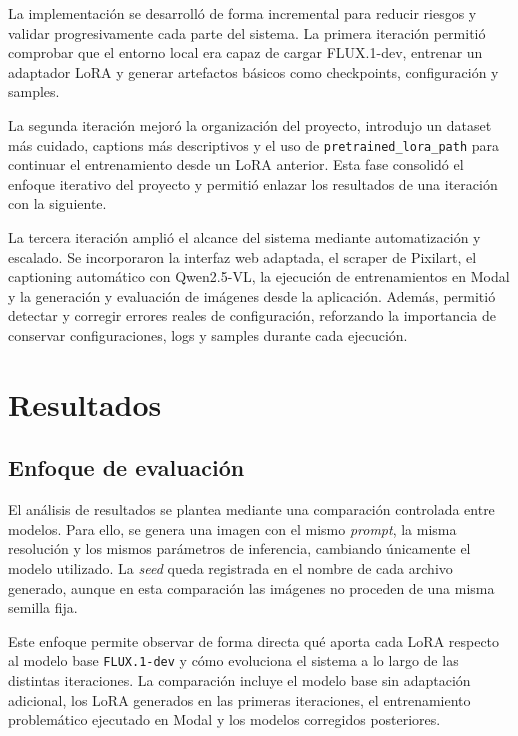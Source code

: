 \documentclass[a4paper,11pt,titlepage]{scrbook}
\begin{document}
La implementación se desarrolló de forma incremental para reducir riesgos y validar progresivamente cada parte del sistema. La primera iteración permitió comprobar que el entorno local era capaz de cargar FLUX.1-dev, entrenar un adaptador LoRA y generar artefactos básicos como checkpoints, configuración y samples.

\medskip

La segunda iteración mejoró la organización del proyecto, introdujo un dataset más cuidado, captions más descriptivos y el uso de \texttt{pretrained_lora_path} para continuar el entrenamiento desde un LoRA anterior. Esta fase consolidó el enfoque iterativo del proyecto y permitió enlazar los resultados de una iteración con la siguiente.

\medskip

La tercera iteración amplió el alcance del sistema mediante automatización y escalado. Se incorporaron la interfaz web adaptada, el scraper de Pixilart, el captioning automático con Qwen2.5-VL, la ejecución de entrenamientos en Modal y la generación y evaluación de imágenes desde la aplicación. Además, permitió detectar y corregir errores reales de configuración, reforzando la importancia de conservar configuraciones, logs y samples durante cada ejecución.
\chapter{Resultados}
\label{resultados}

\section{Enfoque de evaluación}

El análisis de resultados se plantea mediante una comparación controlada entre modelos. Para ello, se genera una imagen con el mismo \textit{prompt}, la misma resolución y los mismos parámetros de inferencia, cambiando únicamente el modelo utilizado. La \textit{seed} queda registrada en el nombre de cada archivo generado, aunque en esta comparación las imágenes no proceden de una misma semilla fija.
\medskip

Este enfoque permite observar de forma directa qué aporta cada LoRA respecto al modelo base \texttt{FLUX.1-dev} y cómo evoluciona el sistema a lo largo de las distintas iteraciones. La comparación incluye el modelo base sin adaptación adicional, los LoRA generados en las primeras iteraciones, el entrenamiento problemático ejecutado en Modal y los modelos corregidos posteriores.
\end{document}
